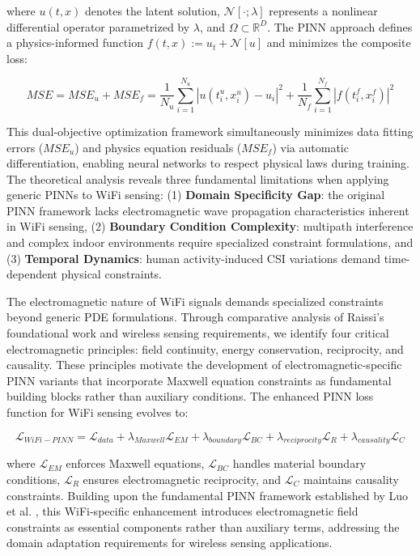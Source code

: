 \documentclass[journal]{IEEEtran}
\begin{document}
where $u(t,x)$ denotes the latent solution, $\mathcal{N}[\cdot; \lambda]$ represents a nonlinear differential operator parametrized by $\lambda$, and $\Omega \subset \mathbb{R}^D$. The PINN approach defines a physics-informed function $f(t,x) := u_t + \mathcal{N}[u]$ and minimizes the composite loss:

\begin{equation}
MSE = MSE_u + MSE_f = \frac{1}{N_u}\sum_{i=1}^{N_u}|u(t_i^u, x_i^u) - u_i|^2 + \frac{1}{N_f}\sum_{i=1}^{N_f}|f(t_i^f, x_i^f)|^2
\label{eq:raissi_loss}
\end{equation}

This dual-objective optimization framework simultaneously minimizes data fitting errors ($MSE_u$) and physics equation residuals ($MSE_f$) via automatic differentiation, enabling neural networks to respect physical laws during training. The theoretical analysis reveals three fundamental limitations when applying generic PINNs to WiFi sensing: (1) \textbf{Domain Specificity Gap}: the original PINN framework lacks electromagnetic wave propagation characteristics inherent in WiFi sensing, (2) \textbf{Boundary Condition Complexity}: multipath interference and complex indoor environments require specialized constraint formulations, and (3) \textbf{Temporal Dynamics}: human activity-induced CSI variations demand time-dependent physical constraints.

The electromagnetic nature of WiFi signals demands specialized constraints beyond generic PDE formulations. Through comparative analysis of Raissi's foundational work and wireless sensing requirements, we identify four critical electromagnetic principles: field continuity, energy conservation, reciprocity, and causality. These principles motivate the development of electromagnetic-specific PINN variants that incorporate Maxwell equation constraints as fundamental building blocks rather than auxiliary conditions. The enhanced PINN loss function for WiFi sensing evolves to:

\begin{equation}
\mathcal{L}_{WiFi-PINN} = \mathcal{L}_{data} + \lambda_{Maxwell} \mathcal{L}_{EM} + \lambda_{boundary} \mathcal{L}_{BC} + \lambda_{reciprocity} \mathcal{L}_{R} + \lambda_{causality} \mathcal{L}_{C}
\label{eq:wifi_pinn_loss}
\end{equation}

where $\mathcal{L}_{EM}$ enforces Maxwell equations, $\mathcal{L}_{BC}$ handles material boundary conditions, $\mathcal{L}_{R}$ ensures electromagnetic reciprocity, and $\mathcal{L}_{C}$ maintains causality constraints. Building upon the fundamental PINN framework established by Luo et al. \cite{luo2025physics}, this WiFi-specific enhancement introduces electromagnetic field constraints as essential components rather than auxiliary terms, addressing the domain adaptation requirements for wireless sensing applications.
\end{document}
